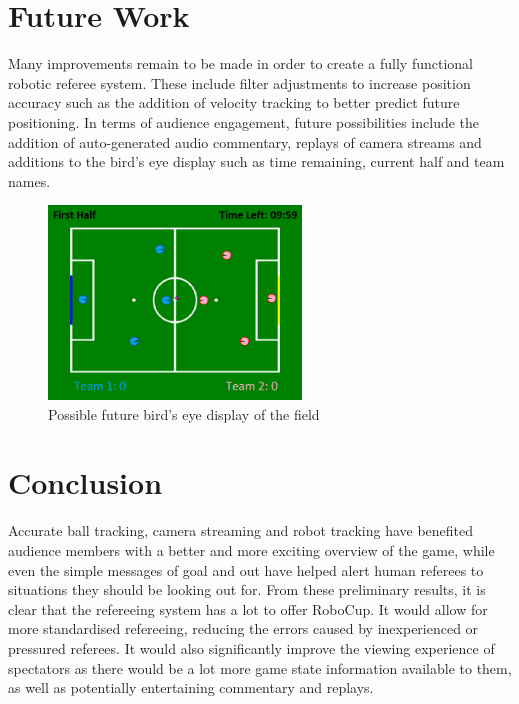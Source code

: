\documentclass[runningheads,a4paper]{llncs}
\begin{document}
\section{Future Work}

Many improvements remain to be made in order to create a fully functional robotic referee system. These include filter adjustments to increase position accuracy such as the addition of velocity tracking to better predict future positioning. In terms of audience engagement, future possibilities include the addition of auto-generated audio commentary, replays of camera streams and additions to the bird's eye display such as time remaining, current half and team names.

\begin{figure}[h!]
  \centering
    \includegraphics[width=0.6\textwidth]{figures/display-future}
  \caption{Possible future bird's eye display of the field}
\end{figure}

\section{Conclusion}

Accurate ball tracking, camera streaming and robot tracking have benefited audience members with a better and more exciting overview of the game, while even the simple messages of goal and out have helped alert human referees to situations they should be looking out for.
From these preliminary results, it is clear that the refereeing system has a lot to offer RoboCup.
It would allow for more standardised refereeing, reducing the errors caused by inexperienced or pressured referees.
It would also significantly improve the viewing experience of spectators as there would be a lot more game state information available to them, as well as potentially entertaining commentary and replays.



\end{document}
